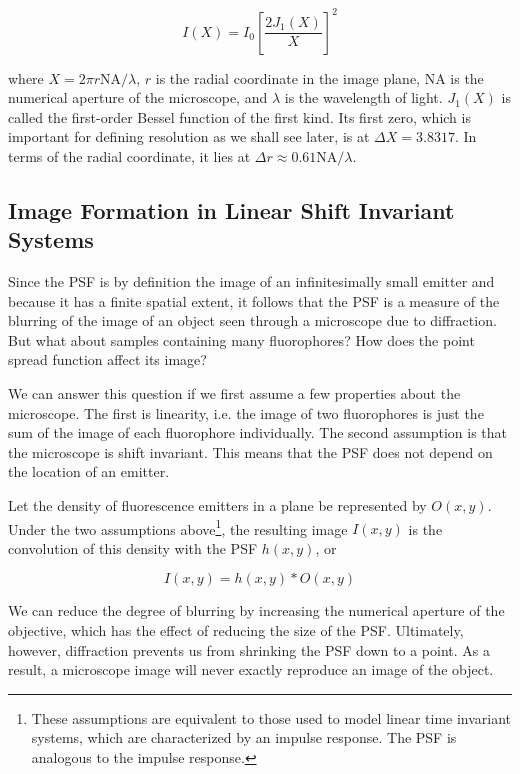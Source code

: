 \documentclass[10pt,a4paper]{book}
\begin{document}
\begin{equation}
    I \left(X\right) = I_{0} \left[ \frac{2 J_{1}\left(X\right)}{X} \right]^2
\end{equation}

\noindent where $ X = 2 \pi r \text{NA} / \lambda $, $r$ is the radial coordinate in the image plane, $\text{NA}$ is the numerical aperture of the microscope, and $\lambda$ is the wavelength of light. $J_{1}\left(X\right)$ is called the first-order Bessel function of the first kind. Its first zero, which is important for defining resolution as we shall see later, is at $\Delta X = 3.8317$. In terms of the radial coordinate, it lies at $\Delta r \approx 0.61 \text{NA} / \lambda$.

\subsection{Image Formation in Linear Shift Invariant Systems}

Since the PSF is by definition the image of an infinitesimally small emitter and because it has a finite spatial extent, it follows that the PSF is a measure of the blurring of the image of an object seen through a microscope due to diffraction. But what about samples containing many fluorophores? How does the point spread function affect its image?

We can answer this question if we first assume a few properties about the microscope. The first is linearity, i.e. the image of two fluorophores is just the sum of the image of each fluorophore individually. The second assumption is that the microscope is shift invariant. This means that the PSF does not depend on the location of an emitter. 

Let the density of fluorescence emitters in a plane be represented by $O \left(x, y\right)$. Under the two assumptions above\footnote{These assumptions are equivalent to those used to model linear time invariant systems, which are characterized by an impulse response. The PSF is analogous to the impulse response.}, the resulting image $I \left(x, y\right)$ is the convolution of this density with the PSF $h \left(x, y\right)$, or

\begin{equation} \label{eq:image-formation}
    I \left(x, y\right) = h \left(x, y\right) \ast O \left(x, y\right)
\end{equation}

We can reduce the degree of blurring by increasing the numerical aperture of the objective, which has the effect of reducing the size of the PSF. Ultimately, however, diffraction prevents us from shrinking the PSF down to a point. As a result, a microscope image will never exactly reproduce an image of the object.
\end{document}
